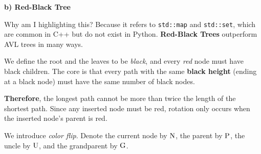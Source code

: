 \documentclass{article}
\begin{document}
\vspace{2ex}

\textbf{b) Red-Black Tree}

Why am I highlighting this? Because it refers to \texttt{std::map} and \texttt{std::set}, which are common in C++ but do not exist in Python. \textbf{Red-Black Trees} outperform AVL trees in many ways.

We define the root and the leaves to be \emph{black}, and every \emph{red} node must have black children. The core is that every path with the same \textbf{black height} (ending at a black node) must have the same number of black nodes.

\textbf{Therefore}, the longest path cannot be more than twice the length of the shortest path. Since any inserted node must be red, rotation only occurs when the inserted node's parent is red.

We introduce \emph{color flip}. Denote the current node by $\text N$, the parent by $\text P$, the uncle by $\text U$, and the grandparent by $\text G$.
\end{document}
